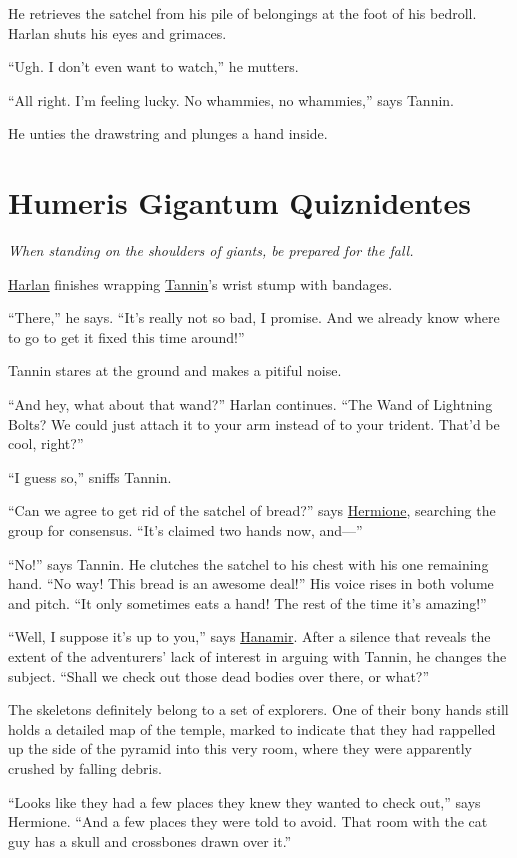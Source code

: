 \documentclass[smalldemyvopaper,11pt,twoside,onecolumn,openright,extrafontsizes]{memoir}
\newcommand{\chapdesc}[1]{
    \begin{flushright}
    \emph{{#1}}
    \end{flushright}
    \vspace{26pt}
}
\begin{document}
He retrieves the satchel from his pile of belongings at the foot of his
bedroll. Harlan shuts his eyes and grimaces.

``Ugh. I don't even want to watch,'' he mutters.

``All right. I'm feeling lucky. No whammies, no whammies,'' says Tannin.

He unties the drawstring and plunges a hand inside.


\chapter{Humeris Gigantum Quiznidentes}
\chapdesc{When standing on the shoulders of giants, be prepared for the fall.}

\href{/characters/harlan/}{Harlan} finishes wrapping
\href{/characters/tannin/}{Tannin}'s wrist stump with bandages.

``There,'' he says. ``It's really not so bad, I promise. And we already
know where to go to get it fixed this time around!''

Tannin stares at the ground and makes a pitiful noise.

``And hey, what about that wand?'' Harlan continues. ``The Wand of
Lightning Bolts? We could just attach it to your arm instead of to your
trident. That'd be cool, right?''

``I guess so,'' sniffs Tannin.

``Can we agree to get rid of the satchel of bread?'' says
\href{/characters/hermione/}{Hermione}, searching the group for
consensus. ``It's claimed two hands now, and---''

``No!'' says Tannin. He clutches the satchel to his chest with his one
remaining hand. ``No way! This bread is an awesome deal!'' His voice
rises in both volume and pitch. ``It only sometimes eats a hand! The
rest of the time it's amazing!''

``Well, I suppose it's up to you,'' says
\href{/characters/hanamir/}{Hanamir}. After a silence that reveals the
extent of the adventurers' lack of interest in arguing with Tannin, he
changes the subject. ``Shall we check out those dead bodies over there,
or what?''

The skeletons definitely belong to a set of explorers. One of their bony
hands still holds a detailed map of the temple, marked to indicate that
they had rappelled up the side of the pyramid into this very room, where
they were apparently crushed by falling debris.

``Looks like they had a few places they knew they wanted to check out,''
says Hermione. ``And a few places they were told to avoid. That room
with the cat guy has a skull and crossbones drawn over it.''
\end{document}

